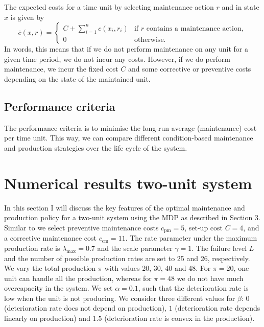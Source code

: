 \documentclass[a4paper,12pt]{article}
\begin{document}
The expected costs for a time unit by selecting maintenance action $r$ and in state $x$ is given by
$$
\bar{c}(x,r) = \begin{cases}
C + \sum_{i=1}^{n}c(x_i, r_i) &\text{if } r \text{ contains a maintenance action},\\
0 &\text{otherwise}.
\end{cases}
$$
In words, this means that if we do not perform maintenance on any unit for a given time period, we do not incur any costs. However, if we do perform maintenance, we incur the fixed cost $C$ and some corrective or preventive costs depending on the state of the maintained unit.
\subsection{Performance criteria}
The performance criteria is to minimise the long-run average (maintenance) cost per time unit. This way, we can compare different condition-based maintenance and production strategies over the life cycle of the system.

\section{Numerical results two-unit system}
In this section I will discuss the key features of the optimal maintenance and production policy for a two-unit system using the MDP as described in Section 3. Similar to \cite{OLDEKEIZER2018319} we select preventive maintenance costs $c_\text{pm} = 5$, set-up cost $C = 4$, and a corrective maintenance cost $c_\text{cm} = 11$. The rate parameter under the maximum production rate is $\lambda_{\text{max}} = 0.7$ and the scale parameter $\gamma = 1$. The failure level $L$ and the number of possible production rates are set to 25 and 26, respectively. We vary the total production $\pi$ with values 20, 30, 40 and 48. For $\pi = 20$, one unit can handle all the production, whereas for $\pi = 48$ we do not have much overcapacity in the system. We set $\alpha = 0.1$, such that the deterioration rate is low when the unit is not producing. We consider three different values for $\beta$:  $0$ (deterioration rate does not depend on production), $1$ (deterioration rate depends linearly on production) and $1.5$ (deterioration rate is convex in the production).
\end{document}
